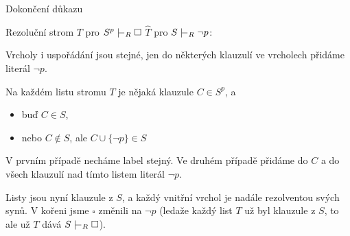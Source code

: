 \documentclass{beamer}
\begin{document}
\begin{frame}{Dokončení důkazu}

    Rezoluční strom \alert{$T$ pro $S^p\proves_R\square$} \scalebox{1.5}{$\rightsquigarrow$} \alert{$\widehat T$ pro $S\proves_R \neg p$}: 
    
    Vrcholy i uspořádání jsou stejné, jen do některých klauzulí ve vrcholech \alert{přidáme literál $\neg p$}. 
    
    Na každém listu stromu $T$ je nějaká klauzule $C\in S^p$, a
    \begin{itemize}
        \item buď $C\in S$,
        \item nebo $C\notin S$, ale $C\cup\{\neg p\}\in S$
    \end{itemize}
    
    V prvním případě necháme label stejný. Ve druhém případě přidáme do $C$ \alert{a do všech klauzulí nad tímto listem} literál $\neg p$. 
    
    Listy jsou nyní klauzule z $S$, a každý vnitřní vrchol je nadále rezolventou svých synů. V kořeni jsme $\square$ změnili na $\neg p$ (ledaže každý list $T$ už byl klauzule z $S$, to ale už $T$ dává $S\proves_R\square$). \hfill\qedsymbol

\end{frame}
\end{document}
